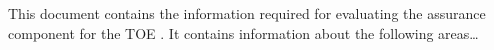 
This document contains the information required for evaluating the assurance
component  for the TOE \thisproductlong{}. It contains
information about the following areas\dots


